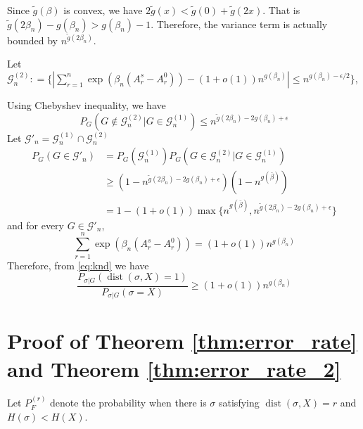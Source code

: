 \documentclass[journal]{IEEEtran}
\newcommand{\cG}{\mathcal{G}}
\newcommand{\1}{\mathbbm{1}}
\DeclareMathOperator{\dist}{dist}
\begin{document}
Since $\tilde{g}(\beta)$ is convex,
we have $2\tilde{g}(x) < \tilde{g}(0) + \tilde{g}(2x)$. That is $\tilde{g}(2\beta_n) - g(\beta_n) > g(\beta_n) - 1$.
Therefore, the variance term is actually bounded by $n^{\tilde{g}(2\beta_n)} $.

Let $\cG^{(2)}_n: = \{|\sum_{r=1}^n \exp(\beta_n (A_r^s - A_r^0)) - (1+o(1))n^{g(\beta_n)}  | \leq n^{g(\beta_n) - \epsilon / 2} \}$,

Using Chebyshev inequality, we have
\begin{equation*}
P_G(G \not\in \cG^{(2)}_n \Big\vert  G \in \cG^{(1)}_n) \leq n^{\tilde{g}(2\beta_n) - 2g(\beta_n) + \epsilon}
\end{equation*}
Let $\cG'_n = \cG^{(1)}_n \cap \cG^{(2)}_n$
\begin{align*}
P_G(G \in \cG'_n) &= P_G(\cG^{(1)}_n) P_G(G \in \cG_n^{(2)} | G \in \cG_n^{(1)}) \\
& \geq (1-n^{\tilde{g}(2\beta_n) - 2g(\beta_n) + \epsilon})(1-n^{g(\bar{\beta})}) \\
&= 1-(1+o(1))\max\{n^{g(\bar{\beta})}, n^{\tilde{g}(2\beta_n) - 2g(\beta_n) + \epsilon} \}
\end{align*}
and for every $G\in\cG'_n$,
\begin{equation*}
\sum_{r=1}^n \exp(\beta_n (A_r^s - A_r^0)) = (1+o(1)) n^{g(\beta_n)}
\end{equation*}
Therefore, from \eqref{eq:knd} we have
\begin{equation*}
	\frac{P_{\sigma|G}(\dist(\sigma, X)=1)}
{P_{\sigma|G}(\sigma=X)} \geq (1+o(1)) n^{g(\beta_n)}
\end{equation*}
\section*{Proof of Theorem \ref{thm:error_rate} and Theorem \ref{thm:error_rate_2}}
Let $P_F^{(r)}$ denote the probability when there is $\sigma$ satisfying $\dist(\sigma, X) = r$ and $H(\sigma) < H(X)$.
\end{document}
